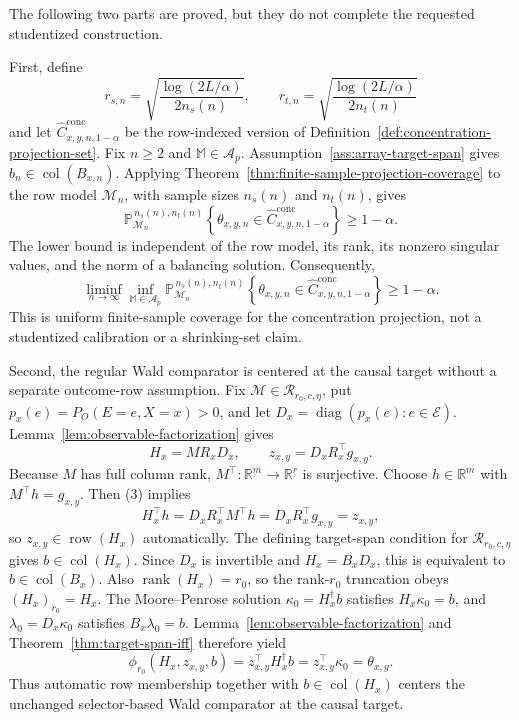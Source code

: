 The following two parts are proved, but they do not complete the requested studentized construction.

First, define
\[
r_{s,n}=\sqrt{\frac{\log(2L/\alpha)}{2n_s(n)}},
\qquad
r_{t,n}=\sqrt{\frac{\log(2L/\alpha)}{2n_t(n)}}
\]
and let \(\widehat C^{\mathrm{conc}}_{x,y,n,1-\alpha}\) be the row-indexed version of Definition~\ref{def:concentration-projection-set}. Fix \(n\ge2\) and \(\mathbb M\in\mathcal A_p\). Assumption~\ref{ass:array-target-span} gives \(b_n\in\operatorname{col}(B_{x,n})\). Applying Theorem~\ref{thm:finite-sample-projection-coverage} to the row model \(\mathcal M_n\), with sample sizes \(n_s(n)\) and \(n_t(n)\), gives
\[
\mathbb P_{\mathcal M_n}^{\,n_s(n),n_t(n)}
\left\{\theta_{x,y,n}\in
\widehat C^{\mathrm{conc}}_{x,y,n,1-\alpha}\right\}
\ge1-\alpha.
\tag{1}
\]
The lower bound is independent of the row model, its rank, its nonzero singular values, and the norm of a balancing solution. Consequently,
\[
\liminf_{n\to\infty}\inf_{\mathbb M\in\mathcal A_p}
\mathbb P_{\mathcal M_n}^{\,n_s(n),n_t(n)}
\left\{\theta_{x,y,n}\in
\widehat C^{\mathrm{conc}}_{x,y,n,1-\alpha}\right\}
\ge1-\alpha.
\tag{2}
\]
This is uniform finite-sample coverage for the concentration projection, not a studentized calibration or a shrinking-set claim.

Second, the regular Wald comparator is centered at the causal target without a separate outcome-row assumption. Fix \(\mathcal M\in\mathcal R_{r_0,c,\eta}\), put \(p_x(e)=P_O(E=e,X=x)>0\), and let \(D_x=\operatorname{diag}(p_x(e):e\in\mathcal E)\). Lemma~\ref{lem:observable-factorization} gives
\[
H_x=MR_xD_x,
\qquad
z_{x,y}=D_xR_x^{\top}g_{x,y}.
\tag{3}
\]
Because \(M\) has full column rank, \(M^{\top}:\mathbb R^m\to\mathbb R^r\) is surjective. Choose \(h\in\mathbb R^m\) with \(M^{\top}h=g_{x,y}\). Then (3) implies
\[
H_x^{\top}h=D_xR_x^{\top}M^{\top}h
=D_xR_x^{\top}g_{x,y}=z_{x,y},
\tag{4}
\]
so \(z_{x,y}\in\operatorname{row}(H_x)\) automatically. The defining target-span condition for \(\mathcal R_{r_0,c,\eta}\) gives \(b\in\operatorname{col}(H_x)\). Since \(D_x\) is invertible and \(H_x=B_xD_x\), this is equivalent to \(b\in\operatorname{col}(B_x)\). Also \(\operatorname{rank}(H_x)=r_0\), so the rank-\(r_0\) truncation obeys \((H_x)_{r_0}=H_x\). The Moore--Penrose solution \(\kappa_0=H_x^{\dagger}b\) satisfies \(H_x\kappa_0=b\), and \(\lambda_0=D_x\kappa_0\) satisfies \(B_x\lambda_0=b\). Lemma~\ref{lem:observable-factorization} and Theorem~\ref{thm:target-span-iff} therefore yield
\[
\phi_{r_0}(H_x,z_{x,y},b)
=z_{x,y}^{\top}H_x^{\dagger}b
=z_{x,y}^{\top}\kappa_0
=\theta_{x,y}.
\tag{5}
\]
Thus automatic row membership together with \(b\in\operatorname{col}(H_x)\) centers the unchanged selector-based Wald comparator at the causal target.

